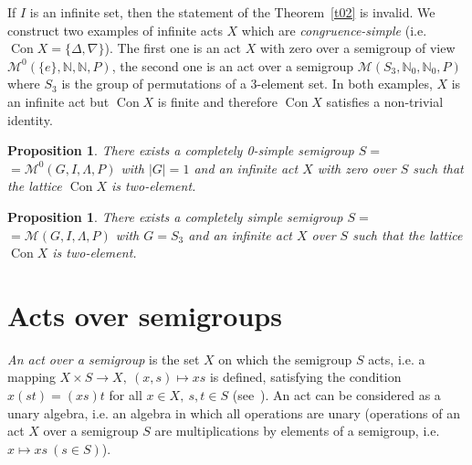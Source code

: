 \documentclass{birkau}
\numberwithin{equation}{section}
\theoremstyle{plain}
\newtheorem{proposition}[theorem]{Proposition}
\theoremstyle{definition}
\DeclareMathOperator{\Con}{Con}
\begin{document}
	If $I$ is an infinite set, then the statement of the Theorem~\ref{t02} is invalid. We construct two examples of infinite acts $X$ which are \textit{congruence-simple} (i.e. $\Con X = \{ \Delta, \nabla \}$). The first one is an act $X$ with zero over a semigroup of view $\mathcal{M}^0(\{e\},\mathbb{N},\mathbb{N},P)$, the second one is an act over a semigroup $\mathcal{M}(S_3,\mathbb{N}_0,\mathbb{N}_0,P)$ where $S_3$ is the group of permutations of a 3-element set. In both examples, $X$ is an infinite act but $\Con X$ is finite and therefore $\Con X$ satisfies a non-trivial identity.
	
	\begin{proposition} \label{pr01a}
	    There exists a completely 0-simple semigroup $ S = $ \newline $ = \mathcal{M}^0(G,I,\Lambda,P) $ with $|G| = 1$ and an infinite act $X$ with zero over $S$ such that the lattice $\Con X$ is two-element.
	\end{proposition}
	
	\begin{proposition} \label{pr2.1}
	    There exists a completely simple semigroup $ S = $ \newline $ = \mathcal{M}(G,I,\Lambda,P) $ with $G = S_3$ and an infinite act $X$ over $S$ such that the lattice $\Con X$ is two-element.
	\end{proposition}

\section{Acts over semigroups}	

	\textit{An act over a semigroup} is the set $X$ on which the semigroup $S$ acts, i.e. a mapping $ X \times S \rightarrow X,\ (x,s) \mapsto xs $ is defined, satisfying the condition $ x(st)=(xs)t $ for all $x\in X,\ s,t\in S$ (see~\cite{kilp}). An act can be considered as a unary algebra, i.e. an algebra in which all operations are unary (operations of an act $X$ over a semigroup $S$ are multiplications by elements of a semigroup, i.e. $ x \mapsto xs \ (s\in S) $).
	
\end{document}
